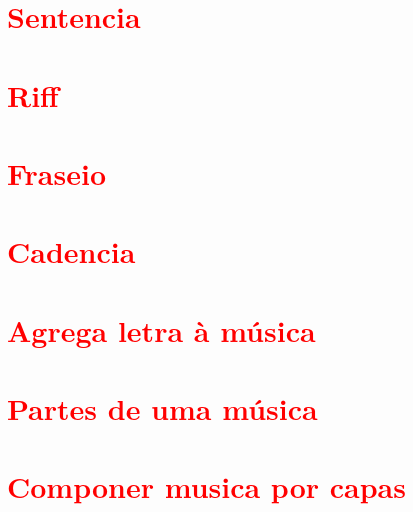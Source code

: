 \section{\textcolor{red}{Sentencia}}
\section{\textcolor{red}{Riff}}

\section{\textcolor{red}{Fraseio}}


\section{\textcolor{red}{Cadencia}}

\cite[pp. 111]{holst1998abc}



\section{\textcolor{red}{Agrega letra à música}}

\cite[pp. 149]{medteoria}


\section{\textcolor{red}{Partes de uma música}}

\section{\textcolor{red}{Componer musica por capas}}


